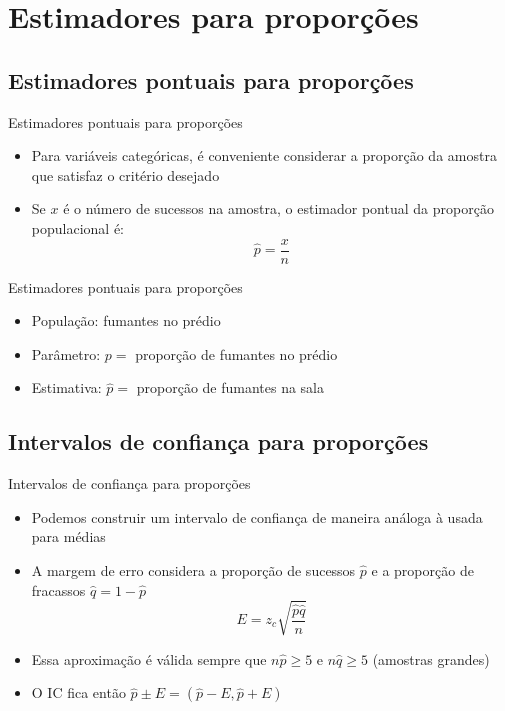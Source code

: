 \documentclass{beamer}
\begin{document}
\section{Estimadores para proporções}

\subsection{Estimadores pontuais para proporções}

\begin{frame}{Estimadores pontuais para proporções}
  \begin{itemize}
  \item Para variáveis categóricas, é conveniente considerar
    a proporção da amostra que satisfaz o critério desejado
  \item Se $x$ é o número de sucessos na amostra, o estimador pontual
    da proporção populacional é:
    \begin{displaymath}
      \hat{p} = \frac{x}{n}
    \end{displaymath}
  \end{itemize}
\end{frame}

\begin{frame}{Estimadores pontuais para proporções}
  \begin{example}
    \begin{itemize}
    \item População: fumantes no prédio
    \item Parâmetro: $p=$ proporção de fumantes no prédio
    \item Estimativa: $\hat{p}=$ proporção de fumantes na sala
    \end{itemize}
  \end{example}
\end{frame}

\subsection{Intervalos de confiança para proporções}

\begin{frame}{Intervalos de confiança para proporções}
  \begin{itemize}
  \item Podemos construir um intervalo de confiança de maneira análoga
    à usada para médias
  \item A margem de erro considera a proporção de sucessos $\hat{p}$ e
    a proporção de fracassos $\hat{q} = 1- \hat{p}$
    \begin{displaymath}
      E = z_c \sqrt{\frac{\hat{p}\hat{q} }{n}}      
    \end{displaymath}
  \item Essa aproximação é válida sempre que $n\hat{p}\ge 5$ e
    $n\hat{q}\ge 5$ (amostras grandes)
  \item O IC fica então $\hat{p} \pm E = (\hat{p} -E, \hat{p} +E)$
  \end{itemize}
\end{frame}
\end{document}
